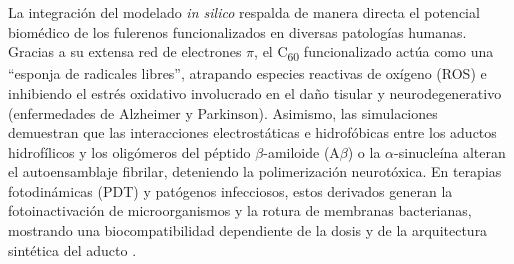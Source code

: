 La integración del modelado \textit{in silico} respalda de manera directa el potencial biomédico de los fulerenos funcionalizados en diversas patologías humanas. Gracias a su extensa red de electrones $\pi$, el C\textsubscript{60} funcionalizado actúa como una ``esponja de radicales libres'', atrapando especies reactivas de oxígeno (ROS) e inhibiendo el estrés oxidativo involucrado en el daño tisular y neurodegenerativo (enfermedades de Alzheimer y Parkinson). Asimismo, las simulaciones demuestran que las interacciones electrostáticas e hidrofóbicas entre los aductos hidrofílicos y los oligómeros del péptido $\beta$-amiloide ($\text{A}\beta$) o la $\alpha$-sinucleína alteran el autoensamblaje fibrilar, deteniendo la polimerización neurotóxica. En terapias fotodinámicas (PDT) y patógenos infecciosos, estos derivados generan la fotoinactivación de microorganismos y la rotura de membranas bacterianas, mostrando una biocompatibilidad dependiente de la dosis y de la arquitectura sintética del aducto \cite{wilson2024role, wang2024strain,  celaya2022administracion, partha2009biomedical}.
  



















